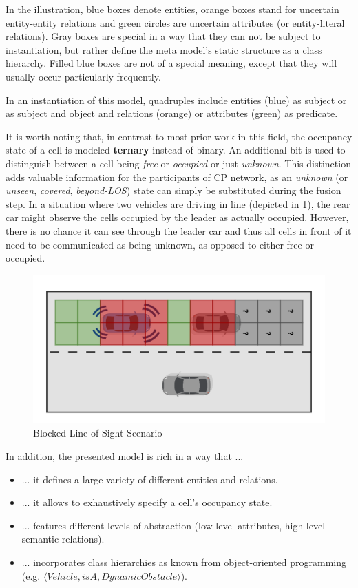 In the illustration, blue boxes denote entities, orange boxes stand for uncertain entity-entity relations and green circles are uncertain attributes (or entity-literal relations). Gray boxes are special in a way that they can not be subject to instantiation, but rather define the meta model's static structure as a class hierarchy. Filled blue boxes are not of a special meaning, except that they will usually occur particularly frequently.

In an instantiation of this model, quadruples include entities (blue) as subject or as subject and object and relations (orange) or attributes (green) as predicate. 

It is worth noting that, in contrast to most prior work in this field, the occupancy state of a cell is modeled \textbf{ternary} instead of binary. An additional bit is used to distinguish between a cell being \textit{free} or \textit{occupied} or just \textit{unknown}. This distinction adds valuable information for the participants of CP network, as an  \textit{unknown} (or \textit{unseen}, \textit{covered}, \textit{beyond-LOS}) state can simply be substituted during the fusion step. In a situation where two vehicles are driving in line (depicted in \cref{fig:blocked_los_scenario}), the rear car might observe the cells occupied by the leader as actually occupied. However, there is no chance it can see through the leader car and thus all cells in front of it need to be communicated as being unknown, as opposed to either free or occupied.

\begin{figure}[h]
	\centering
	\includegraphics[width=0.7\linewidth]{98_images/unknown_cells_scene}
	\caption{Blocked Line of Sight Scenario}
	\label{fig:blocked_los_scenario}
\end{figure}


In addition, the presented model is rich in a way that ...

\begin{samepage}
	\begin{itemize}
		\item ... it defines a large variety of different entities and relations.
		\item ... it allows to exhaustively specify a cell's occupancy state.
		\item ... features different levels of abstraction (low-level attributes, high-level semantic relations).
		\item ... incorporates class hierarchies as known from object-oriented programming (e.g. $\langle Vehicle, isA, DynamicObstacle \rangle$).
	\end{itemize}
\end{samepage}

